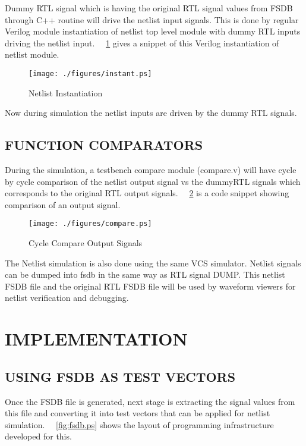 Dummy RTL signal which is having the original RTL signal values from FSDB through C++ routine will drive the netlist input signals. This is done by regular Verilog module instantiation of netlist top level module with dummy RTL inputs driving the netlist input. ~\figurename{~\ref{fig:instant.ps}} gives a snippet of this Verilog instantiation of netlist module.

\begin{figure}[h]
\centering
\texttt{[image: ./figures/instant.ps]}
\caption{Netlist Instantiation}
\label{fig:instant.ps}
\end{figure}

Now during simulation the netlist inputs are driven by the dummy RTL signals.

\subsection{FUNCTION COMPARATORS}

During the simulation, a testbench compare module (compare.v) will have cycle by cycle comparison of the netlist output signal vs the dummyRTL signals which corresponds to the original RTL output signals. ~\figurename{~\ref{fig:compare.ps}} is a code snippet showing comparison of an output signal. 

\begin{figure}[h]
\centering
\texttt{[image: ./figures/compare.ps]}
\caption{Cycle Compare Output Signals}
\label{fig:compare.ps}
\end{figure}

The Netlist simulation is also done using the same VCS simulator. Netlist signals can be dumped into fsdb in the same way as RTL signal DUMP. This netlist FSDB file and the original RTL FSDB file will be used by waveform viewers for netlist verification and debugging.



\section{IMPLEMENTATION}



\subsection{USING FSDB AS TEST VECTORS}
Once the FSDB file is generated, next stage is extracting the signal values from this file and converting it into test vectors that can be applied for netlist simulation.  ~\figurename{~\ref{fig:fsdb.ps}} shows the layout of programming infrastructure developed for this.

